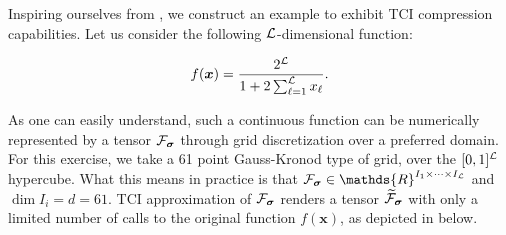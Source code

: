 \begin{example}
Inspiring ourselves from \cite{Fernandez2024}, we construct an example to exhibit TCI compression capabilities. Let us consider the following $\mathcal{L}$-dimensional function: 

\begin{equation}
	f(\boldsymbol{x}) = 
   \frac{2^{\mathcal{L}}}{1 + 2 \sum^{\mathcal{L}}_{\ell=1} x_\ell} .
   \label{eq:Ldimfunc}
\end{equation}

As one can easily understand, such a continuous function can be numerically represented by a tensor $\mathcal{F}_{\boldsymbol{\sigma}}$ through grid discretization over a preferred domain. For this exercise, we take a 61 point Gauss-Kronod type of grid, over the $[0,1]^{\mathcal{L}}$ hypercube. What this means in practice is that $\mathcal{F}_{\bsigma} \in \mathds{R}^{I_1\times\dots\times I_\mL}$ \footnotemark and $\dim I_i = d = 61$. TCI approximation of $\mathcal{F}_{\boldsymbol{\sigma}}$ renders a tensor $\widetilde{\mathcal{F}}_{\boldsymbol{\sigma}}$ with only a limited number of calls to the original function $f(\boldsymbol{x})$, as depicted in  below. 



\end{example}
